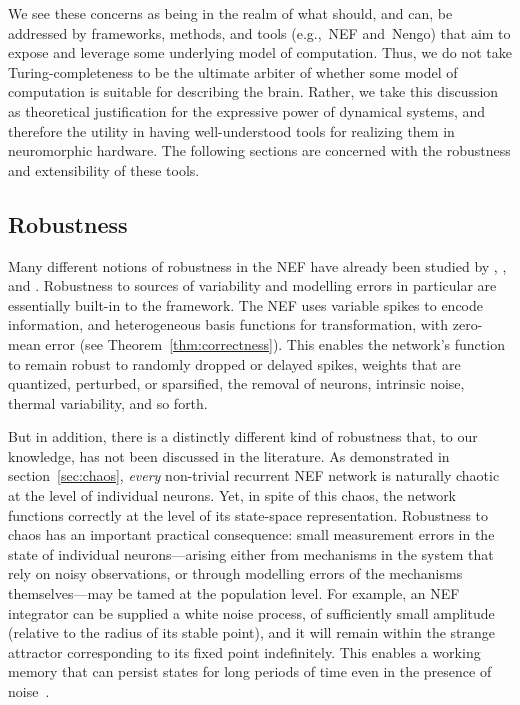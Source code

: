 We see these concerns as being in the realm of what should, and can, be addressed by frameworks, methods, and tools (e.g.,~NEF and~Nengo) that aim to expose and leverage some underlying model of computation.
Thus, we do not take Turing-completeness to be the ultimate arbiter of whether some model of computation is suitable for describing the brain.
Rather, we take this discussion as theoretical justification for the expressive power of dynamical systems, and therefore the utility in having well-understood tools for realizing them in neuromorphic hardware.
The following sections are concerned with the robustness and extensibility of these tools.

\subsection{Robustness}
\label{sec:nef-robustness}

Many different notions of robustness in the NEF have already been studied by \citet{eliasmith2003a}, \citet{eliasmith2012}, and \citet{eliasmith2013build}.
Robustness to sources of variability and modelling errors in particular are essentially built-in to the framework.
The NEF uses variable spikes to encode information, and heterogeneous basis functions for transformation, with zero-mean error (see Theorem~\ref{thm:correctness}).
This enables the network's function to remain robust to randomly dropped or delayed spikes, weights that are quantized, perturbed, or sparsified, the removal of neurons, intrinsic noise, thermal variability, and so forth.

But in addition, there is a distinctly different kind of robustness that, to our knowledge, has not been discussed in the literature.
As demonstrated in section~\ref{sec:chaos}, \emph{every} non-trivial recurrent NEF network is naturally chaotic at the level of individual neurons.
Yet, in spite of this chaos, the network functions correctly at the level of its state-space representation.
Robustness to chaos has an important practical consequence: small measurement errors in the state of individual neurons---arising either from mechanisms in the system that rely on noisy observations, or through modelling errors of the mechanisms themselves---may be tamed at the population level. 
For example, an NEF integrator can be supplied a white noise process, of sufficiently small amplitude (relative to the radius of its stable point), and it will remain within the strange attractor corresponding to its fixed point indefinitely. 
This enables a working memory that can persist states for long periods of time even in the presence of noise~\citep{singh2004}.

